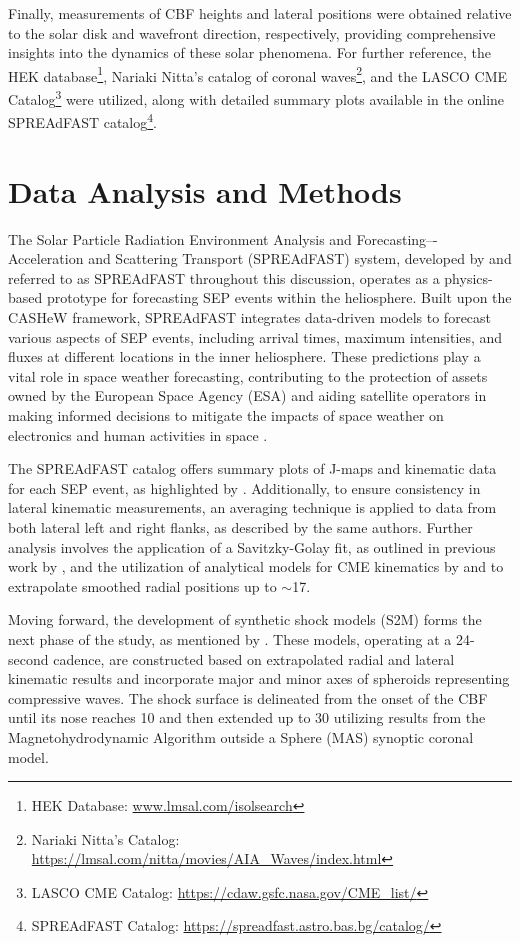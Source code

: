 Finally, measurements of CBF heights and lateral positions were obtained relative to the solar disk and wavefront direction, respectively, providing comprehensive insights into the dynamics of these solar phenomena.
For further reference, the HEK database\footnote{HEK Database: \url{www.lmsal.com/isolsearch}}, Nariaki Nitta's catalog of coronal waves\footnote{Nariaki Nitta's Catalog: \url{https://lmsal.com/nitta/movies/AIA_Waves/index.html}}, and the LASCO CME Catalog\footnote{LASCO CME Catalog: \url{https://cdaw.gsfc.nasa.gov/CME_list/}} were utilized, along with detailed summary plots available in the online SPREAdFAST catalog\footnote{SPREAdFAST Catalog: \url{https://spreadfast.astro.bas.bg/catalog/}}.

\section{Data Analysis and Methods}
The Solar Particle Radiation Environment Analysis and Forecasting–-Acceleration and Scattering Transport (SPREAdFAST) system, developed by \citet{kozarev_2022} and referred to as SPREAdFAST throughout this discussion, operates as a physics-based prototype for forecasting SEP events within the heliosphere. Built upon the CASHeW framework, SPREAdFAST integrates data-driven models to forecast various aspects of SEP events, including arrival times, maximum intensities, and fluxes at different locations in the inner heliosphere. These predictions play a vital role in space weather forecasting, contributing to the protection of assets owned by the European Space Agency (ESA) and aiding satellite operators in making informed decisions to mitigate the impacts of space weather on electronics and human activities in space \citep{kozarev_2022}.

The SPREAdFAST catalog offers summary plots of J-maps and kinematic data for each SEP event, as highlighted by \citet{kozarev_2022}. Additionally, to ensure consistency in lateral kinematic measurements, an averaging technique is applied to data from both lateral left and right flanks, as described by the same authors. Further analysis involves the application of a Savitzky-Golay fit, as outlined in previous work by \citet{kozarev_2019}, and the utilization of analytical models for CME kinematics by \citet{gallagher_2003} and \citet{byrne_2013} to extrapolate smoothed radial positions up to $\sim$17\rsun.

Moving forward, the development of synthetic shock models (S2M) forms the next phase of the study, as mentioned by \citet{kozarev_2022}. These models, operating at a 24-second cadence, are constructed based on extrapolated radial and lateral kinematic results and incorporate major and minor axes of spheroids representing compressive waves. The shock surface is delineated from the onset of the CBF until its nose reaches 10 \rsun and then extended up to 30 \rsun utilizing results from the Magnetohydrodynamic Algorithm outside a Sphere (MAS) synoptic coronal model.

